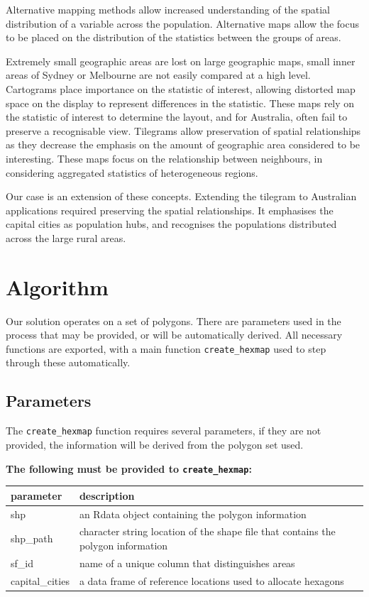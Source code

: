 Alternative mapping methods allow increased understanding of the spatial
distribution of a variable across the population. Alternative maps allow
the focus to be placed on the distribution of the statistics between the
groups of areas.

Extremely small geographic areas are lost on large geographic maps,
small inner areas of Sydney or Melbourne are not easily compared at a
high level. Cartograms place importance on the statistic of interest,
allowing distorted map space on the display to represent differences in
the statistic. These maps rely on the statistic of interest to determine
the layout, and for Australia, often fail to preserve a recognisable
view. Tilegrams allow preservation of spatial relationships as they
decrease the emphasis on the amount of geographic area considered to be
interesting. These maps focus on the relationship between neighbours, in
considering aggregated statistics of heterogeneous regions.

Our case is an extension of these concepts. Extending the tilegram to
Australian applications required preserving the spatial relationships.
It emphasises the capital cities as population hubs, and recognises the
populations distributed across the large rural areas.

\hypertarget{algorithm}{%
\section{Algorithm}\label{algorithm}}

Our solution operates on a set of polygons. There are parameters used in
the process that may be provided, or will be automatically derived. All
necessary functions are exported, with a main function
\texttt{create\_hexmap} used to step through these automatically.

\hypertarget{parameters}{%
\subsection{Parameters}\label{parameters}}

The \texttt{create\_hexmap} function requires several parameters, if
they are not provided, the information will be derived from the polygon
set used.

\textbf{The following must be provided to \texttt{create\_hexmap}:}

\begin{Schunk}

\begin{tabular}{l|l}
\hline
parameter & description\\
\hline
shp & an Rdata object containing the polygon information\\
\hline
shp\_path & character string location of the shape file that contains the polygon information\\
\hline
sf\_id & name of a unique column that distinguishes areas\\
\hline
capital\_cities & a data frame of reference locations used to allocate hexagons\\
\hline
\end{tabular}

\end{Schunk}

